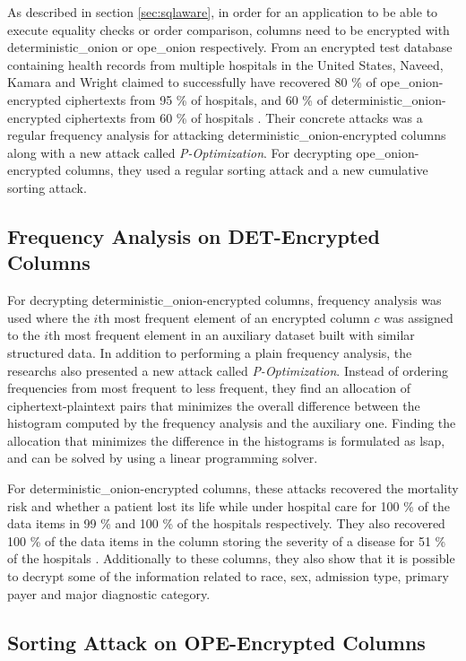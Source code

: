 As described in section \ref{sec:sqlaware}, in order for an application to be able to execute equality checks or order comparison, columns need to be encrypted with \gls{deterministic_onion} or \gls{ope_onion} respectively. From an encrypted test database containing health records from multiple hospitals in the United States, Naveed, Kamara and Wright claimed to successfully have recovered 80 \% of \gls{ope_onion}-encrypted ciphertexts from 95 \% of hospitals, and 60 \% of \gls{deterministic_onion}-encrypted ciphertexts from 60 \% of hospitals \cite{microsoft_cryptdb}. Their concrete attacks was a regular frequency analysis for attacking \gls{deterministic_onion}-encrypted columns along with a new attack called \emph{P-Optimization}. For decrypting \gls{ope_onion}-encrypted columns, they used a regular sorting attack and a new cumulative sorting attack.

\subsection{Frequency Analysis on DET-Encrypted Columns}

For decrypting \gls{deterministic_onion}-encrypted columns, frequency analysis was used where the $i$th most frequent element of an encrypted column $c$ was assigned to the $i$th most frequent element in an auxiliary dataset built with similar structured data. In addition to performing a plain frequency analysis, the researchs also presented a new attack called \emph{P-Optimization}. Instead of ordering frequencies from most frequent to less frequent, they find an allocation of ciphertext-plaintext pairs that minimizes the overall difference between the histogram computed by the frequency analysis and the auxiliary one. Finding the allocation that minimizes the difference in the histograms is formulated as \gls{lsap}, and can be solved by using a linear programming solver.

For \gls{deterministic_onion}-encrypted columns, these attacks recovered the mortality risk and whether a patient lost its life while under hospital care for 100 \% of the data items in 99 \% and 100 \% of the hospitals respectively. They also recovered 100 \% of the data items in the column storing the severity of a disease for 51 \% of the hospitals \cite{microsoft_cryptdb}. Additionally to these columns, they also show that it is possible to decrypt some of the information related to race, sex, admission type, primary payer and major diagnostic category.

\subsection{Sorting Attack on OPE-Encrypted Columns}

